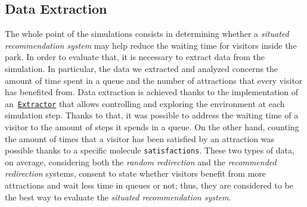 \subsection{Data Extraction}\label{subsec:data-extraction}
The whole point of the simulations consists in determining whether a \textit{situated recommendation system} may help reduce the waiting time for visitors inside the park.
In order to evaluate that, it is necessary to extract data from the simulation.
In particular, the data we extracted and analyzed concerns the amount of time spent in a queue and the number of attractions that every visitor has benefited from.
Data extraction is achieved thanks to the implementation of an~\href{https://alchemistsimulator.github.io/reference/kdoc/alchemist/it.unibo.alchemist.loader.export/-extractor/index.html}{\texttt{Extractor}} that allows controlling and exploring the environment at each simulation step.
Thanks to that, it was possible to address the waiting time of a visitor to the amount of steps it spends in a queue.
On the other hand, counting the amount of times that a visitor has been satisfied by an attraction was possible thanks to a specific molecule \texttt{satisfactions}.
These two types of data, on average, considering both the \textit{random redirection} and the \textit{recommended redirection} systems, consent to state whether visitors benefit from more attractions and wait less time in queues or not; thus, they are considered to be the best way to evaluate the \textit{situated recommendation system}.

